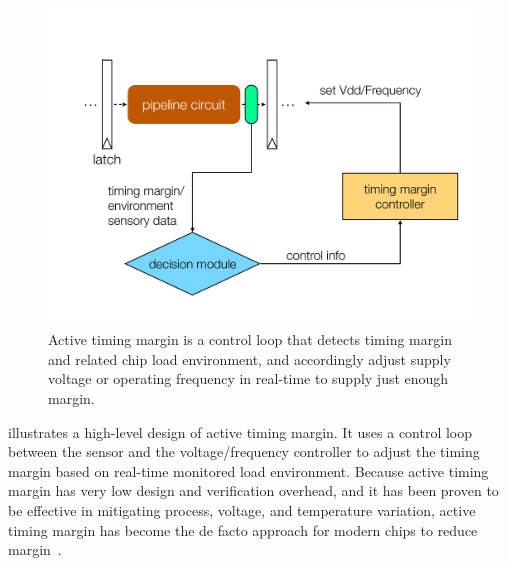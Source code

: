 \begin{figure}[t!]
\centering 
  \includegraphics[trim=0 0 0 0,clip,width=0.9\linewidth]{graphs/background/atm.pdf}
  \caption{Active timing margin is a control loop that detects timing margin and related chip load environment, and accordingly adjust supply voltage or operating frequency in real-time to supply just enough margin.}
  \label{fig:atm-example}
\vspace{-0.2in}
\end{figure}

 illustrates a high-level design of active timing margin. It uses a control loop between the sensor and the voltage/frequency controller to adjust the timing margin based on real-time monitored load environment. Because active timing margin has very low design and verification overhead, and it has been proven to be effective in mitigating process, voltage, and temperature variation, active timing margin has become the de facto approach for modern chips to reduce margin~\cite{efurgy2011active, bowman201222nm, tokunaga20145,grenat20145,bowman20158,webel2015robust,vezyrtzis2018droop,zu2016tistate}.

